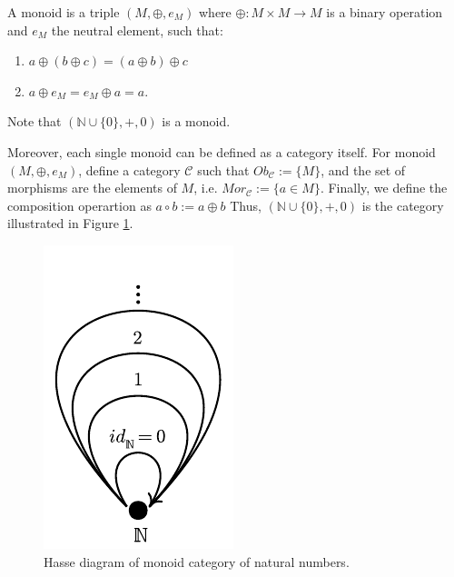 \begin{example}[Monoids]
  A monoid is a triple $(M, \oplus, e_M)$ where $\oplus:M\times M \to M$ is a binary operation
  and $e_M$ the neutral element, such that:
  \begin{enumerate}
    \item $a \oplus (b \oplus c) = (a \oplus b) \oplus c$
    \item $a \oplus e_M = e_M \oplus a = a$.
  \end{enumerate}
  Note that $(\mathbb N \cup\{ 0\}, +, 0)$ is a monoid.

  Moreover, each single monoid can be defined as a category itself. For
  monoid $(M, \oplus, e_M)$, define a category $\mathcal C$
  such that $Ob_\mathcal C := \{M\}$, and the set of morphisms
  are the elements of $M$, i.e.
  $Mor_\mathcal C := \{a \in M\}$. Finally, we define the composition
  operartion as $a \circ b := a \oplus b$
  Thus, $(\mathbb N \cup \{0\}, +, 0)$ is the category illustrated in
  Figure \ref{fig:NMonoid}.

  \begin{figure}[H]
    \begin{center}
      \includegraphics{./notebooks/NMonoid}
    \end{center}
    \caption{Hasse diagram of monoid category of natural numbers.}
    \label{fig:NMonoid}
  \end{figure}
  
\end{example}

